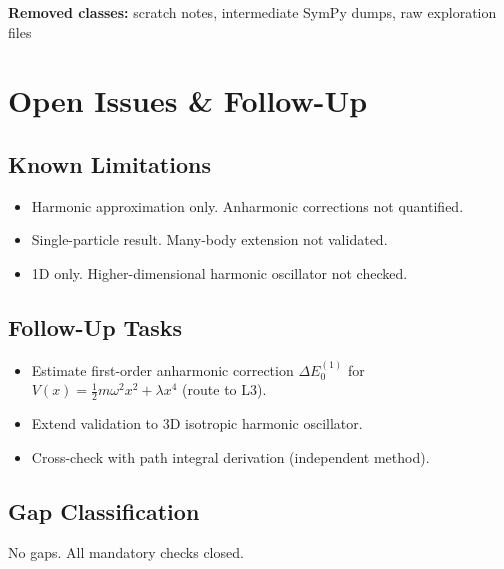 \documentclass[11pt,a4paper]{article}
\begin{document}
\noindent\textbf{Removed classes:} scratch notes, intermediate SymPy dumps, raw exploration files

\section{Open Issues \& Follow-Up}

\subsection{Known Limitations}
\begin{itemize}
  \item Harmonic approximation only. Anharmonic corrections not quantified.
  \item Single-particle result. Many-body extension not validated.
  \item 1D only. Higher-dimensional harmonic oscillator not checked.
\end{itemize}

\subsection{Follow-Up Tasks}
\begin{itemize}
  \item Estimate first-order anharmonic correction $\Delta E_0^{(1)}$ for
    $V(x) = \frac{1}{2}m\omega^2 x^2 + \lambda x^4$ (route to L3).
  \item Extend validation to 3D isotropic harmonic oscillator.
  \item Cross-check with path integral derivation (independent method).
\end{itemize}

\subsection{Gap Classification}
No gaps. All mandatory checks closed.

\end{document}
